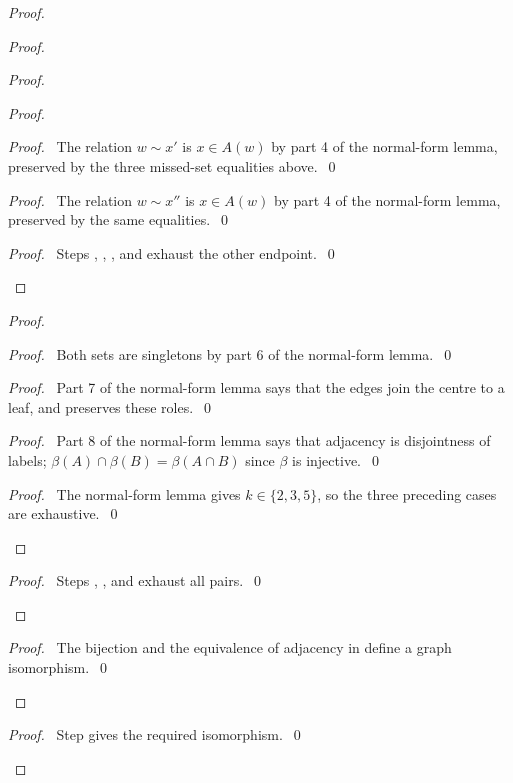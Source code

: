 \begin{proof}
\begin{proof}
\begin{proof}
\begin{proof}
    \begin{proof}\pf\ The relation $w\sim x'$ is $x\in A(w)$ by part 4 of the
     normal-form lemma, preserved by the three missed-set equalities above.~\qed\end{proof}
    \begin{proof}\pf\ The relation $w\sim x''$ is $x\in A(w)$ by part 4 of the
     normal-form lemma, preserved by the same equalities.~\qed\end{proof}
    \qedstep
    \begin{proof}\pf\ Steps , ,
     , and  exhaust the other endpoint.~\qed\end{proof}
   \end{proof}
   \begin{proof}
    \begin{proof}\pf\ Both sets are singletons by part 6 of the normal-form lemma.~\qed\end{proof}
    \begin{proof}\pf\ Part 7 of the normal-form lemma says that the edges join
     the centre to a leaf, and  preserves these roles.~\qed\end{proof}
    \begin{proof}\pf\ Part 8 of the normal-form lemma says that adjacency is disjointness
     of labels; $\beta(A)\cap\beta(B)=\beta(A\cap B)$ since $\beta$ is injective.~\qed\end{proof}
    \qedstep
    \begin{proof}\pf\ The normal-form lemma gives $k\in\{2,3,5\}$, so the three
     preceding cases are exhaustive.~\qed\end{proof}
   \end{proof}
   \qedstep
   \begin{proof}\pf\ Steps , , and
     exhaust all pairs.~\qed\end{proof}
  \end{proof}
  \qedstep
  \begin{proof}\pf\ The bijection  and the equivalence of
   adjacency in  define a graph isomorphism.~\qed\end{proof}
 \end{proof}
 \qedstep
 \begin{proof}\pf\ Step  gives the required isomorphism.~\qed\end{proof}
\end{proof}

